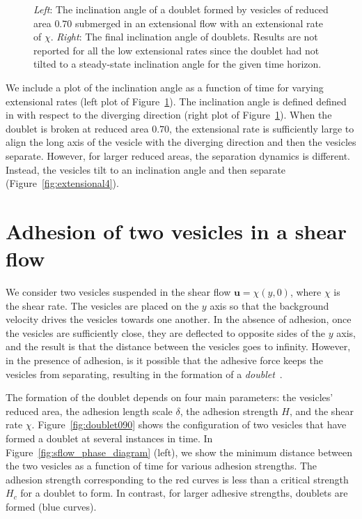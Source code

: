 \documentclass[prf,superscriptaddress,showpacs]{revtex4-1}
\newcommand{\uu}{\mathbf{u}}
\begin{document}
\begin{figure}[htp]
\begin{minipage}{0.45\textwidth}
  \end{minipage}
  \caption{\label{fig:extensionalInclinationAngle} {\em Left}: The
  inclination angle of a doublet formed by vesicles of reduced area
  $0.70$ submerged in an extensional flow with an extensional rate of
  $\chi$.  {\em Right}: The final inclination angle of doublets.
  Results are not reported for all the low extensional rates since the
  doublet had not tilted to a steady-state inclination angle for the
  given time horizon.}
\end{figure}

We include a plot of the inclination angle as a function of time for
varying extensional rates (left plot of
Figure~\ref{fig:extensionalInclinationAngle}).  The inclination angle is
defined defined in with respect to the diverging direction (right plot
of Figure~\ref{fig:extensionalInclinationAngle}).  When the doublet is
broken at reduced area $0.70$, the extensional rate is sufficiently
large to align the long axis of the vesicle with the diverging direction
and then the vesicles separate.  However, for larger reduced areas, the
separation dynamics is different.  Instead, the vesicles tilt to an
inclination angle and then separate (Figure~\ref{fig:extensional4}).


\section{Adhesion of two vesicles in a shear flow}
\label{sec:sflow} 
We consider two vesicles suspended in the shear flow $\uu = \chi(y,0)$,
where $\chi$ is the shear rate.  The vesicles are placed on the $y$ axis
so that the background velocity drives the vesicles towards one another.
In the absence of adhesion, once the vesicles are sufficiently close,
they are deflected to opposite sides of the $y$ axis, and the result is
that the distance between the vesicles goes to infinity.  However, in
the presence of adhesion, is it possible that the adhesive force keeps
the vesicles from separating, resulting in the formation of a {\em
doublet}~\cite{}.

The formation of the doublet depends on four main parameters: the
vesicles' reduced area, the adhesion length scale $\delta$, the adhesion
strength $H$, and the shear rate $\chi$.  Figure~\ref{fig:doublet090}
shows the configuration of two vesicles that have formed a doublet at
several instances in time.  In Figure~\ref{fig:sflow_phase_diagram}
(left), we show the minimum distance between the two vesicles as a
function of time for various adhesion strengths.  The adhesion strength
corresponding to the red curves is less than a critical strength $H_c$
for a doublet to form.  In contrast, for larger adhesive strengths,
doublets are formed (blue curves).
\end{document}
